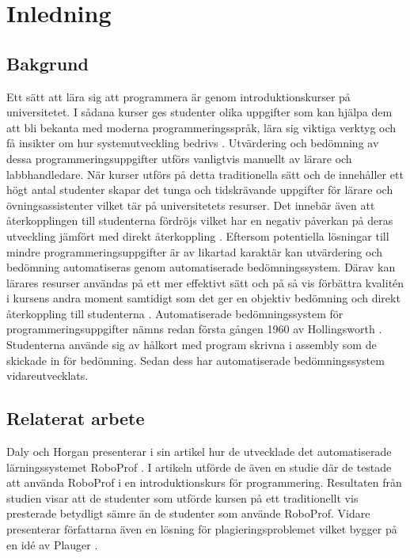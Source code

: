 \documentclass[a4paper,11pt]{article}
\begin{document}
{\newpage

\mbox{}

\newpage
\tableofcontents
\newpage
\ifodd\value{page}\else\mbox{}\newpage\fi
\setcounter{page}{1}
\renewcommand{\thepage}{\rempage}

\section{Inledning}

\subsection{Bakgrund}\label{Bakgrund}

Ett sätt att lära sig att programmera är genom introduktionskurser på universitetet. I sådana kurser ges studenter olika uppgifter som kan hjälpa dem att bli bekanta med moderna programmeringsspråk, lära sig viktiga verktyg och få insikter om hur systemutveckling bedrivs \cite{douce_11}. Utvärdering och bedömning av dessa programmeringsuppgifter utförs vanligtvis manuellt av lärare och labbhandledare. När kurser utförs på detta traditionella sätt och de innehåller ett högt antal studenter skapar det tunga och tidskrävande uppgifter för lärare och övningsassistenter vilket tär på universitetets resurser. Det innebär även att återkopplingen till studenterna fördröjs vilket har en negativ påverkan på deras utveckling jämfört med direkt återkoppling \cite{japanerna_1}. Eftersom potentiella lösningar till mindre programmeringsuppgifter är av likartad karaktär kan utvärdering och bedömning automatiseras genom automatiserade bedömningssystem. Därav kan lärares resurser användas på ett mer effektivt sätt och på så vis förbättra kvalitén i kursens andra moment samtidigt som det ger en objektiv bedömning och direkt återkoppling till studenterna \cite{douce_11} \cite{hollingsworth_2} \cite{higgins_3}. Automatiserade bedömningssystem för programmeringsuppgifter nämns redan första gången 1960 av Hollingsworth \cite{hollingsworth_2}. Studenterna använde sig av hålkort med program skrivna i assembly som de skickade in för bedömning. Sedan dess har automatiserade bedömningssystem vidareutvecklats.

\subsection{Relaterat arbete}

Daly och Horgan \cite{roboprof_4} presenterar i sin artikel hur de utvecklade det automatiserade lärningssystemet RoboProf \cite{roboprof_4}. I artikeln utförde de även en studie där de testade att använda RoboProf i en introduktionskurs för programmering. Resultaten från studien visar att de studenter som utförde kursen på ett traditionellt vis presterade betydligt sämre än de studenter som använde RoboProf. Vidare presenterar författarna även en lösning för plagieringsproblemet vilket bygger på en idé av Plauger \cite{plaguer_5}.

}
\end{document}
